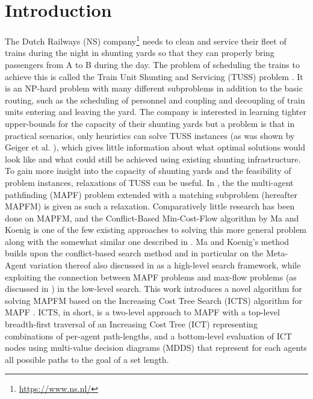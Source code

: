 \documentclass[a4paper,10pt,english]{article}
\begin{document}
	\section*{Introduction}
	The Dutch Railways (NS) company\footnote{\url{https://www.ns.nl/}} needs to clean and service their fleet of trains during the night in shunting yards so that they can properly bring passengers from A to B during the day. The problem of scheduling the trains to achieve this is called the Train Unit Shunting and Servicing (TUSS) problem \cite{mulderij2020}. It is an NP-hard problem with many different subproblems in addition to the basic routing, such as the scheduling of personnel and coupling and decoupling of train units entering and leaving the yard. The company is interested in learning tighter upper-bounds for the capacity of their shunting yards but a problem is that in practical scenarios, only heuristics can solve TUSS instances (as was shown by Geiger et al. \cite{geiger2018}), which gives little information about what optimal solutions would look like and what could still be achieved using existing shunting infrastructure. To gain more insight into the capacity of shunting yards and the feasibility of problem instances, relaxations of TUSS can be useful. In \cite{mulderij2020}, the the multi-agent pathfinding (MAPF) problem extended \cite{stern2019} with a matching subproblem (hereafter MAPFM) is given as such a relaxation. Comparatively little research has been done on MAPFM, and the Conflict-Based Min-Cost-Flow algorithm by Ma and Koenig \cite{ma2016} is one of the few existing approaches to solving this more general problem along with the somewhat similar one described in \cite{henkel2019}. Ma and Koenig's method builds upon the conflict-based search method and in particular on the Meta-Agent variation thereof also discussed in \cite{sharon2015} as a high-level search framework, while exploiting the connection between MAPF problems and max-flow problems (as discussed in \cite{yu2013}) in the low-level search. This work introduces a novel algorithm for solving MAPFM based on the Increasing Cost Tree Search (ICTS) algorithm for MAPF \cite{sharon2011}. ICTS, in short, is a two-level approach to MAPF with a top-level breadth-first traversal of an Increasing Cost Tree (ICT) representing combinations of per-agent path-lengths, and a bottom-level evaluation of ICT nodes using multi-value decision diagrams (MDDS) that represent for each agents all possible paths to the goal of a set length.
	
\end{document}
